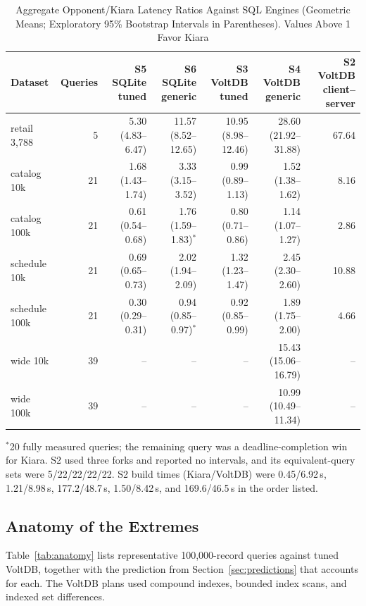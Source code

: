 \begin{table}[t]
\centering
\caption{Aggregate Opponent/Kiara Latency Ratios Against SQL Engines (Geometric Means; Exploratory 95\% Bootstrap Intervals in Parentheses). Values Above 1 Favor Kiara}
\label{tab:sql}
\setlength{\tabcolsep}{4pt}
\renewcommand{\arraystretch}{1.1}
\begin{tabular}{@{}lrrrrrr@{}}
\toprule
Dataset & Queries & S5 SQLite tuned & S6 SQLite generic & S3 VoltDB tuned & S4 VoltDB generic & S2 VoltDB client--server \\
\midrule
retail 3,788 & 5 & 5.30 (4.83--6.47) & 11.57 (8.52--12.65) & 10.95 (8.98--12.46) & 28.60 (21.92--31.88) & 67.64 \\
catalog 10k & 21 & 1.68 (1.43--1.74) & 3.33 (3.15--3.52) & 0.99 (0.89--1.13) & 1.52 (1.38--1.62) & 8.16 \\
catalog 100k & 21 & 0.61 (0.54--0.68) & 1.76 (1.59--1.83)$^{\ast}$ & 0.80 (0.71--0.86) & 1.14 (1.07--1.27) & 2.86 \\
schedule 10k & 21 & 0.69 (0.65--0.73) & 2.02 (1.94--2.09) & 1.32 (1.23--1.47) & 2.45 (2.30--2.60) & 10.88 \\
schedule 100k & 21 & 0.30 (0.29--0.31) & 0.94 (0.85--0.97)$^{\ast}$ & 0.92 (0.85--0.99) & 1.89 (1.75--2.00) & 4.66 \\
wide 10k & 39 & -- & -- & -- & 15.43 (15.06--16.79) & -- \\
wide 100k & 39 & -- & -- & -- & 10.99 (10.49--11.34) & -- \\
\bottomrule
\end{tabular}
\par\vspace{1mm}\parbox{0.97\textwidth}{\footnotesize $^{\ast}$20 fully measured queries; the remaining query was a deadline-completion win for Kiara. S2 used three forks and reported no intervals, and its equivalent-query sets were 5/22/22/22/22. S2 build times (Kiara/VoltDB) were 0.45/6.92\,s, 1.21/8.98\,s, 177.2/48.7\,s, 1.50/8.42\,s, and 169.6/46.5\,s in the order listed.}
\end{table}

\subsection{Anatomy of the Extremes}
\label{sec:anatomy}
Table~\ref{tab:anatomy} lists representative 100,000-record queries against tuned VoltDB, together with the prediction from Section~\ref{sec:predictions} that accounts for each. The VoltDB plans used compound indexes, bounded index scans, and indexed set differences.

